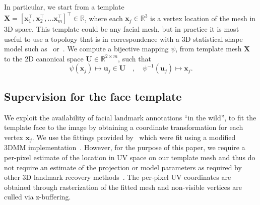 In particular, we start from a template \\
$\bm{X} = [\bm{x}_1^\top ,\bm{x}_2^\top,...\bm{x}_m^\top]^\top \in \mathbb{R}$, where each $\bm{x}_j \in \mathbb{R}^3$ is a vertex location of the mesh in 3D space. 
%
This template could be any facial mesh, but in practice it is most useful to use a topology that is in correspondence with a 3D statistical shape model such as~\cite{booth3d2} or~\cite{paysan20093d}.
%
We compute a bijective mapping $\psi$, from template mesh $\bm{X}$ to the 2D canonical space $\bm{U} \in \mathbb{R}^{2\times m}$, such that  
%
\begin{equation}
\psi(\bm{x}_j) \mapsto \bm{u}_j \in \bm{U}  \quad  ,  \quad  \psi^{-1}(\bm{u}_j) \mapsto \bm{x}_j .
\end{equation} 
%

\subsection{Supervision for the face template}
\label{sec:quantized}
We exploit the availability of facial landmark annotations ``in the wild'', to fit the template face to the image by obtaining a coordinate transformation for each vertex $\bm{x}_j$. 
We use the fittings provided by~\cite{zhu2016face} which were fit using a modified 3DMM implementation~\cite{romdhani2005estimating}. However, for the purpose of this paper, we require a per-pixel estimate of the location in UV space on our template mesh and thus do not require an estimate of the projection or model parameters as required by other 3D landmark recovery methods~\cite{jourabloo2016large,zhu2016face}. The per-pixel UV coordinates are obtained through rasterization of the fitted mesh and non-visible vertices are culled via z-buffering.


